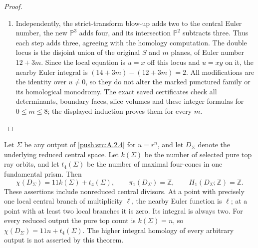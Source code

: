 \begin{proof}
\begin{enumerate}[label=\arabic*.,leftmargin=*]
\item Independently, the strict-transform blow-up adds two to
the central Euler number, the new $\mathbb P^3$ adds
four, and its intersection $\mathbb P^2$ subtracts
three. Thus each step adds three, agreeing with the
homology computation. The double locus is the disjoint
union of the original $S$ and $m$ planes, of Euler number
$12+3m$. Since the local equation is $u=x$ off this locus
and $u=xy$ on it, the nearby Euler integral is
$(14+3m)-(12+3m)=2$. All modifications are the identity
over $u\ne0$, so they do not alter the marked punctured
family or its homological monodromy. The exact saved
certificates check all determinants, boundary faces,
slice volumes and these integer formulas for $0\leq m\leq8$;
the displayed induction proves them for every $m$.
\end{enumerate}
\end{proof}

\begin{theorem}\label{push:src:A.4.7}\label{push:A47}

Let $\Sigma$ be any output of \ref{push:src:A.2.4} for $u=r^n$, and let
$D_\Sigma$ denote the underlying reduced central space.
Let $k(\Sigma)$ be the number of selected pure top ray
orbits, and let $t_4(\Sigma)$ be the number of maximal
four-cones in one fundamental prism. Then
\[
 \chi(D_\Sigma)=11k(\Sigma)+t_4(\Sigma),
 \qquad \pi_1(D_\Sigma)=\mathbb Z,
 \qquad H_1(D_\Sigma;\mathbb Z)=\mathbb Z.
\]
These assertions include nonreduced central divisors.
At a point with precisely one local central branch of
multiplicity $\ell$, the nearby Euler function is $\ell$;
at a point with at least two local branches it is zero.
Its integral is always two. For every reduced output the
pure top count is $k(\Sigma)=n$, so
$\chi(D_\Sigma)=11n+t_4(\Sigma)$.
The higher integral homology of every arbitrary output is
not asserted by this theorem.
\end{theorem}


